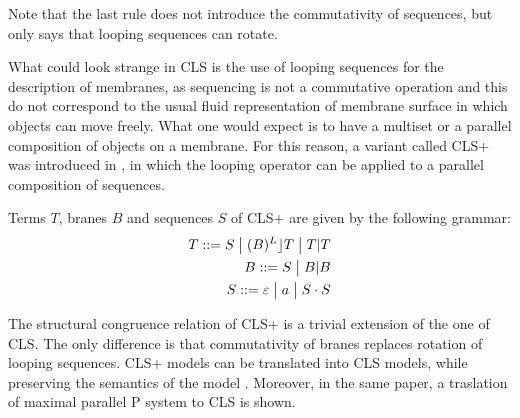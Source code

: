 Note that the last rule does not introduce the commutativity of sequences, but only says that looping sequences can rotate.

What could look strange in CLS is the use of looping sequences for the description of membranes, as sequencing is not a commutative operation and this do not correspond to the usual fluid representation of membrane surface in which objects can move freely. What one would expect is to have a multiset or a parallel composition of objects on a membrane. For this reason, a variant called CLS+ was introduced in \cite{Milazzo07CLS}, in which the looping operator can be applied
to a parallel composition of sequences.

\begin{definition}
  Terms $T$, branes $B$ and sequences $S$ of CLS+ are given by the following grammar:
  \begin{align*}
    T ::= S \;\big|\; (B)^L\rfloor T \;\big|\; T|T\\
    B ::= S \;\big|\; B|B\\
    S ::= \varepsilon \;\big|\; a \;\big|\; S\cdot S
  \end{align*}
\end{definition}

The structural congruence relation of CLS+ is a trivial extension of the one of CLS. The only difference is that commutativity of branes replaces rotation of
looping sequences. CLS+ models can be translated into CLS models, while preserving the semantics of the model \cite{Barbuti07CLS}. Moreover, in the same paper, a traslation of maximal parallel P system to CLS is shown.